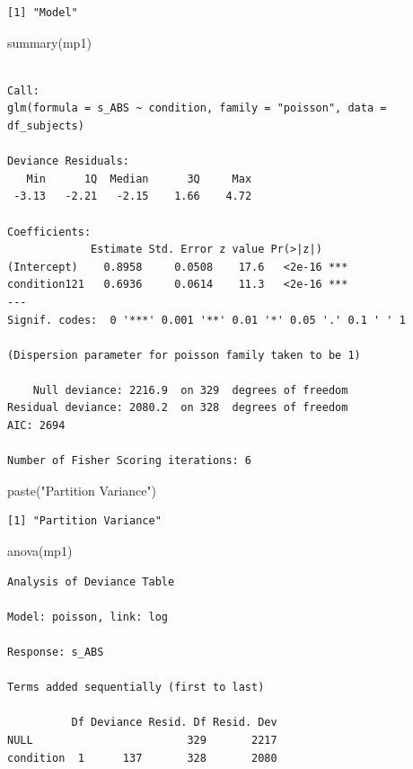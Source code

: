\documentclass[
  letterpaper,
  DIV=11,
  numbers=noendperiod]{scrreprt}
\newenvironment{Shaded}{\begin{snugshade}}{\end{snugshade}}
\newcommand{\FunctionTok}[1]{\textcolor[rgb]{0.28,0.35,0.67}{#1}}
\newcommand{\NormalTok}[1]{\textcolor[rgb]{0.00,0.23,0.31}{#1}}
\newcommand{\StringTok}[1]{\textcolor[rgb]{0.13,0.47,0.30}{#1}}
\begin{document}
\begin{verbatim}
[1] "Model"
\end{verbatim}

\begin{Shaded}
\begin{Highlighting}[]
\FunctionTok{summary}\NormalTok{(mp1)}
\end{Highlighting}
\end{Shaded}

\begin{verbatim}

Call:
glm(formula = s_ABS ~ condition, family = "poisson", data = df_subjects)

Deviance Residuals: 
   Min      1Q  Median      3Q     Max  
 -3.13   -2.21   -2.15    1.66    4.72  

Coefficients:
             Estimate Std. Error z value Pr(>|z|)    
(Intercept)    0.8958     0.0508    17.6   <2e-16 ***
condition121   0.6936     0.0614    11.3   <2e-16 ***
---
Signif. codes:  0 '***' 0.001 '**' 0.01 '*' 0.05 '.' 0.1 ' ' 1

(Dispersion parameter for poisson family taken to be 1)

    Null deviance: 2216.9  on 329  degrees of freedom
Residual deviance: 2080.2  on 328  degrees of freedom
AIC: 2694

Number of Fisher Scoring iterations: 6
\end{verbatim}

\begin{Shaded}
\begin{Highlighting}[]
\FunctionTok{paste}\NormalTok{(}\StringTok{"Partition Variance"}\NormalTok{)}
\end{Highlighting}
\end{Shaded}

\begin{verbatim}
[1] "Partition Variance"
\end{verbatim}

\begin{Shaded}
\begin{Highlighting}[]
\FunctionTok{anova}\NormalTok{(mp1)}
\end{Highlighting}
\end{Shaded}

\begin{verbatim}
Analysis of Deviance Table

Model: poisson, link: log

Response: s_ABS

Terms added sequentially (first to last)

          Df Deviance Resid. Df Resid. Dev
NULL                        329       2217
condition  1      137       328       2080
\end{verbatim}
\end{document}
